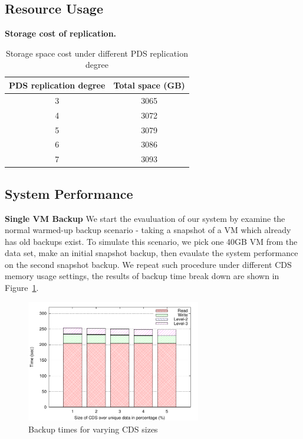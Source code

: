 
\subsection{Resource Usage}
{\bf Storage cost of replication.}
\begin{table}
    \begin{tabular}{|c|c|}
    \hline
    PDS replication degree & Total space (GB) \\ \hline
    3                      & 3065             \\ \hline
    4                      & 3072             \\ \hline
    5                      & 3079             \\ \hline
    6                      & 3086             \\ \hline
    7                      & 3093             \\ \hline
    \end{tabular}
\caption{Storage space cost under different PDS replication degree}
\label{tab:replcation_cost}
\end{table}

\subsection{System Performance}
{\bf Single VM Backup} We start the evauluation of our system by examine the normal warmed-up
backup scenario - taking a snapshot of a VM which already has old backups exist. To simulate this
scenario, we pick one 40GB VM from the data set, make an initial snapshot backup, then
evaulate the system performance on the second snapshot backup. We repeat such procedure
under different CDS memory usage settings, the results of backup time break down are shown in
Figure~\ref{fig:single_vm_backup}. 

\begin{figure}
    \centering
    \includegraphics[width=3in]{figures/single_backup_time.pdf}
    \caption{Backup times for varying CDS sizes}
    \label{fig:single_vm_backup}
\end{figure}

